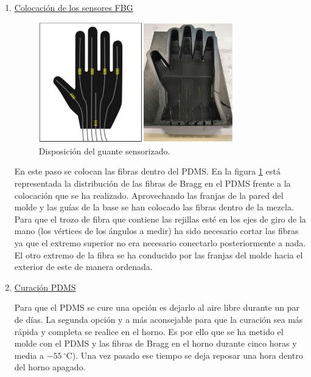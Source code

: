 \begin{itemize}
\begin{enumerate}
		\item \underline{Colocación de los sensores FBG}
		
		\begin{figure}[H]
			\centering
			\includegraphics[width=0.8\textwidth]{./img/diagramaMano2}
			\caption{Disposición del guante sensorizado.} \label{fig:manoFBG}
		\end{figure}
		
		En este paso se colocan las fibras dentro del PDMS. En la figura \ref{fig:manoFBG} está representada la distribución de las fibras de Bragg en el PDMS frente a la colocación que se ha realizado. Aprovechando las franjas de la pared del molde y las guías de la base se han colocado las fibras dentro de la mezcla. Para que el trozo de fibra que contiene las rejillas esté en los ejes de giro de la mano (los vértices de los ángulos a medir) ha sido necesario cortar las fibras ya que el extremo superior no era necesario conectarlo posteriormente a nada. El otro extremo de la fibra se ha conducido por las franjas del molde hacia el exterior de este de manera ordenada.
		
	
		\item \underline{Curación PDMS} 
		
	
		Para que el PDMS se cure una opción es dejarlo al aire libre durante un par de días. La segunda opción y a más aconsejable para que la curación sea más rápida y completa se realice en el horno. 
		Es por ello que se ha metido el molde con el PDMS y las fibras de Bragg en el horno durante cinco horas y media a $-55\,^{\circ}\mathrm{C}$). Una vez pasado ese tiempo se deja reposar una hora dentro del horno apagado. 
		

\end{enumerate}
\end{itemize}
